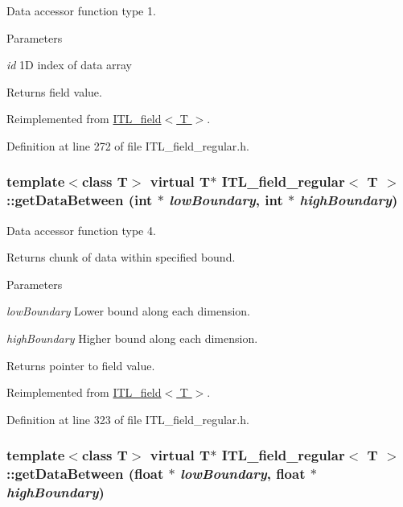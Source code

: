 Data accessor function type 1. 


\begin{DoxyParams}{Parameters}
\item[{\em id}]1D index of data array \end{DoxyParams}
\begin{DoxyReturn}{Returns}
field value. 
\end{DoxyReturn}


Reimplemented from \hyperlink{classITL__field_a9a4b41fbeafd49afde45b608b5db2c09}{ITL\_\-field$<$ T $>$}.



Definition at line 272 of file ITL\_\-field\_\-regular.h.

\hypertarget{classITL__field__regular_af0d8776246431db1f5069f2ce6eb4d2f}{
\subsubsection[{getDataBetween}]{\setlength{\rightskip}{0pt plus 5cm}template$<$class T$>$ virtual T$\ast$ {\bf ITL\_\-field\_\-regular}$<$ T $>$::getDataBetween (int $\ast$ {\em lowBoundary}, \/  int $\ast$ {\em highBoundary})}}
\label{classITL__field__regular_af0d8776246431db1f5069f2ce6eb4d2f}


Data accessor function type 4. 

Returns chunk of data within specified bound. 
\begin{DoxyParams}{Parameters}
\item[{\em lowBoundary}]Lower bound along each dimension. \item[{\em highBoundary}]Higher bound along each dimension. \end{DoxyParams}
\begin{DoxyReturn}{Returns}
pointer to field value. 
\end{DoxyReturn}


Reimplemented from \hyperlink{classITL__field_ab3254f696ccca1b4ea1aae248bea989c}{ITL\_\-field$<$ T $>$}.



Definition at line 323 of file ITL\_\-field\_\-regular.h.

\hypertarget{classITL__field__regular_a13a2ec8f1e67b6a906d1799a58acf9bd}{
\subsubsection[{getDataBetween}]{\setlength{\rightskip}{0pt plus 5cm}template$<$class T$>$ virtual T$\ast$ {\bf ITL\_\-field\_\-regular}$<$ T $>$::getDataBetween (float $\ast$ {\em lowBoundary}, \/  float $\ast$ {\em highBoundary})}}
\label{classITL__field__regular_a13a2ec8f1e67b6a906d1799a58acf9bd}


